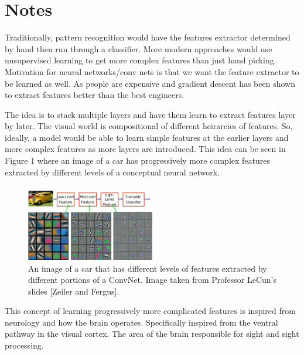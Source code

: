 \documentclass{article}
\begin{document}
%
%
\section{Notes}

Traditionally, pattern recognition would have the features extractor determined by hand then run through a classifier.
More modern approaches would use unsupervised learning to get more complex features than just hand picking.
Motivation for neural networks/conv nets is that we want the feature extractor to be learned as well.
As people are expensive and gradient descent has been shown to extract features better than the best engineers.

\vspace{3mm}

\noindent The idea is to stack multiple layers and have them learn to extract features layer by later.
The visual world is compositional of different heirarcies of features.
So, ideally, a model would be able to learn simple features at the earlier layers and more complex features as more layers are introduced.
This idea can be seen in Figure 1 where an image of a car has progressively more complex features extracted by different levels of a conceptual neural network.

\vspace{3mm}

\begin{figure}[ht!]
  \centering
      \includegraphics[width=0.5\textwidth]{FeatureExtraction.png}
          \caption{
            An image of a car that has different levels of features extracted by different portions of a ConvNet.
            Image taken from Professor LeCun's slides [Zeiler and Fergus].
          }
\end{figure}

\noindent This concept of learning progressively more complicated features is inspired from neurology and how the brain operates.
Specifically inspired from the ventral pathway in the visual cortex.
The area of the brain responsible for sight and sight processing.

\vspace{3mm}
\end{document}
